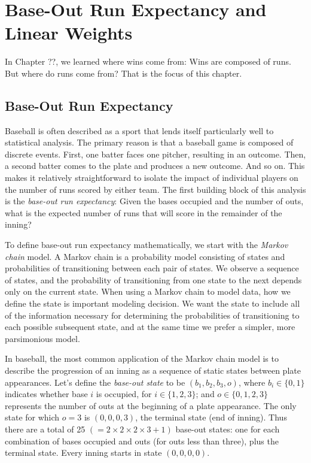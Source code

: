 \documentclass{article}
\begin{document}
  \setcounter{section}{1}
  \section{\sc Base-Out Run Expectancy and Linear Weights}

    In Chapter ??, we learned where wins come from: Wins are composed of runs. But where do runs come from? That is the focus of this chapter.

    \subsection{\sc Base-Out Run Expectancy}

      Baseball is often described as a sport that lends itself particularly well to statistical analysis. The primary reason is that a baseball game is composed of discrete events. First, one batter faces one pitcher, resulting in an outcome. Then, a second batter comes to the plate and produces a new outcome. And so on. This makes it relatively straightforward to isolate the impact of individual players on the number of runs scored by either team. The first building block of this analysis is the {\it base-out run expectancy}: Given the bases occupied and the number of outs, what is the expected number of runs that will score in the remainder of the inning?

      To define base-out run expectancy mathematically, we start with the {\it Markov chain} model. A Markov chain is a probability model consisting of states and probabilities of transitioning between each pair of states. We observe a sequence of states, and the probability of transitioning from one state to the next depends only on the current state. When using a Markov chain to model data, how we define the state is important modeling decision. We want the state to include all of the information necessary for determining the probabilities of transitioning to each possible subsequent state, and at the same time we prefer a simpler, more parsimonious model.

      In baseball, the most common application of the Markov chain model is to describe the progression of an inning as a sequence of static states between plate appearances. Let's define the {\it base-out state} to be $(b_1, b_2, b_3, o)$, where $b_i \in \{0, 1\}$ indicates whether base $i$ is occupied, for $i \in \{1, 2, 3\}$; and $o \in \{0, 1, 2, 3\}$ represents the number of outs at the beginning of a plate appearance. The only state for which $o = 3$ is $(0, 0, 0, 3)$, the terminal state (end of inning). Thus there are a total of 25 $(= 2 \times 2 \times 2 \times 3 + 1)$ base-out states: one for each combination of bases occupied and outs (for outs less than three), plus the terminal state. Every inning starts in state $(0, 0, 0, 0)$.
\end{document}
